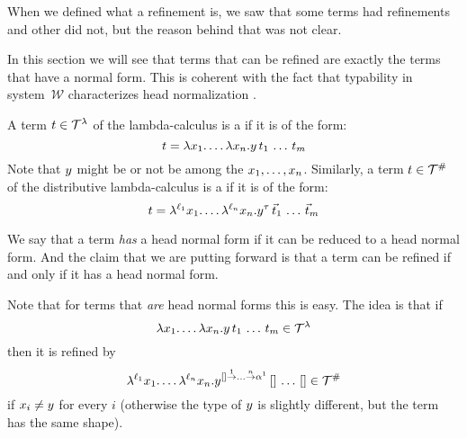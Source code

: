 When we defined what a refinement is, we saw that some terms had refinements and other
did not, but the reason behind that was not clear.

In this section we will see that terms that can be refined are exactly the terms
that have a normal form.
This is coherent with the fact that typability in system~$\mathcal{W}$ characterizes
head normalization \cite[Corollary 5.5]{bucciarelli2017non}.

\begin{definition}
A term $t \in \mathcal{T}^{\lambda}$ of the lambda-calculus is a 
if it is of the form:
\[
  t = \lambda x_1. \hdots\lambda x_n. y\,t_1\,\hdots\,t_m
\]
Note that $y$ might be or not be among the $x_1,\hdots,x_n$.
Similarly, a term $t \in \mathcal{T}^{\mathtt{\#}}$ of the distributive lambda-calculus is a 
if it is of the form:
\[
  t = \lambda^{\ell_1} x_1. \hdots\lambda^{\ell_n} x_n. y^{\tau}\,\vec{t}_1\,\hdots\,\vec{t}_m
\]
\end{definition}

We say that a term \emph{has} a head normal form if it can be reduced to a head normal form.
And the claim that we are putting forward is that a term can be refined if and only if it has
a head normal form.

Note that for terms that \emph{are} head normal forms this is easy. The idea is that
if \[\lambda x_1. \hdots\lambda x_n. y\,t_1\,\hdots\,t_m \in \mathcal{T}^{\lambda}\]
then it is refined by
\[\lambda^{\ell_1} x_1. \hdots\lambda^{\ell_n} x_n. y^{[] \overset{1}{\to} \hdots \overset{n}{\to} \alpha^1}\,[]\,\hdots\,[] \in \mathcal{T}^{\mathtt{\#}}\]
if $x_i \neq y$ for every $i$ (otherwise the type of $y$ is slightly different,
but the term has the same shape).


